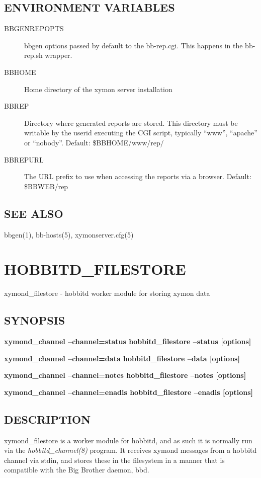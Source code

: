 \subsection{ENVIRONMENT VARIABLES}
\begin{description}
\item[BBGENREPOPTS] bbgen options passed by default to the bb-rep.cgi. This happens in the bb-rep.sh wrapper. 
\item[BBHOME] Home directory of the xymon server installation 
\item[BBREP] Directory where generated reports are stored. This directory must be writable by the userid executing the CGI script, typically ``www'', ``apache'' or ``nobody''. Default: \$BBHOME/www/rep/ 
\item[BBREPURL] The URL prefix to use when accessing the reports via a browser. Default: \$BBWEB/rep 


\end{description}
\subsection{SEE ALSO}
bbgen(1), bb-hosts(5), xymonserver.cfg(5) 

 


  
%
%
\newpage
\section{HOBBITD\_FILESTORE}

 xymond\_filestore - hobbitd worker module for storing xymon data \subsection{SYNOPSIS}
\textbf{xymond\_channel --channel=status hobbitd\_filestore --status [options]}
 
\textbf{xymond\_channel --channel=data hobbitd\_filestore --data [options]}
 
\textbf{xymond\_channel --channel=notes hobbitd\_filestore --notes [options]}
 
\textbf{xymond\_channel --channel=enadis hobbitd\_filestore --enadis [options]}


 
\subsection{DESCRIPTION}
 xymond\_filestore is a worker module for hobbitd, and as such it is normally run via the \emph{hobbitd\_channel(8)}
 program. It receives xymond messages from a hobbitd channel via stdin, and stores these in the filesystem in a manner that is compatible with the Big Brother daemon, bbd. 

